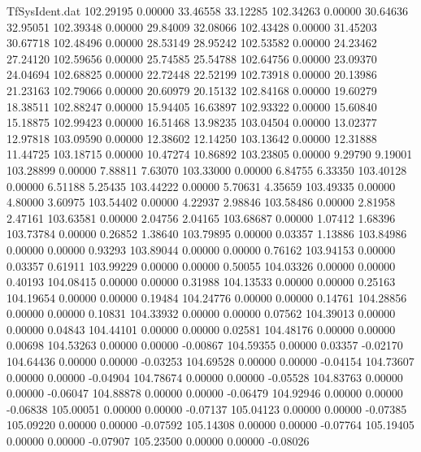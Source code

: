 \begin{filecontents}{TfSysIdent.dat}
 102.29195    0.00000   33.46558   33.12285
 102.34263    0.00000   30.64636   32.95051
 102.39348    0.00000   29.84009   32.08066
 102.43428    0.00000   31.45203   30.67718
 102.48496    0.00000   28.53149   28.95242
 102.53582    0.00000   24.23462   27.24120
 102.59656    0.00000   25.74585   25.54788
 102.64756    0.00000   23.09370   24.04694
 102.68825    0.00000   22.72448   22.52199
 102.73918    0.00000   20.13986   21.23163
 102.79066    0.00000   20.60979   20.15132
 102.84168    0.00000   19.60279   18.38511
 102.88247    0.00000   15.94405   16.63897
 102.93322    0.00000   15.60840   15.18875
 102.99423    0.00000   16.51468   13.98235
 103.04504    0.00000   13.02377   12.97818
 103.09590    0.00000   12.38602   12.14250
 103.13642    0.00000   12.31888   11.44725
 103.18715    0.00000   10.47274   10.86892
 103.23805    0.00000    9.29790    9.19001
 103.28899    0.00000    7.88811    7.63070
 103.33000    0.00000    6.84755    6.33350
 103.40128    0.00000    6.51188    5.25435
 103.44222    0.00000    5.70631    4.35659
 103.49335    0.00000    4.80000    3.60975
 103.54402    0.00000    4.22937    2.98846
 103.58486    0.00000    2.81958    2.47161
 103.63581    0.00000    2.04756    2.04165
 103.68687    0.00000    1.07412    1.68396
 103.73784    0.00000    0.26852    1.38640
 103.79895    0.00000    0.03357    1.13886
 103.84986    0.00000    0.00000    0.93293
 103.89044    0.00000    0.00000    0.76162
 103.94153    0.00000    0.03357    0.61911
 103.99229    0.00000    0.00000    0.50055
 104.03326    0.00000    0.00000    0.40193
 104.08415    0.00000    0.00000    0.31988
 104.13533    0.00000    0.00000    0.25163
 104.19654    0.00000    0.00000    0.19484
 104.24776    0.00000    0.00000    0.14761
 104.28856    0.00000    0.00000    0.10831
 104.33932    0.00000    0.00000    0.07562
 104.39013    0.00000    0.00000    0.04843
 104.44101    0.00000    0.00000    0.02581
 104.48176    0.00000    0.00000    0.00698
 104.53263    0.00000    0.00000   -0.00867
 104.59355    0.00000    0.03357   -0.02170
 104.64436    0.00000    0.00000   -0.03253
 104.69528    0.00000    0.00000   -0.04154
 104.73607    0.00000    0.00000   -0.04904
 104.78674    0.00000    0.00000   -0.05528
 104.83763    0.00000    0.00000   -0.06047
 104.88878    0.00000    0.00000   -0.06479
 104.92946    0.00000    0.00000   -0.06838
 105.00051    0.00000    0.00000   -0.07137
 105.04123    0.00000    0.00000   -0.07385
 105.09220    0.00000    0.00000   -0.07592
 105.14308    0.00000    0.00000   -0.07764
 105.19405    0.00000    0.00000   -0.07907
 105.23500    0.00000    0.00000   -0.08026

\end{filecontents}
